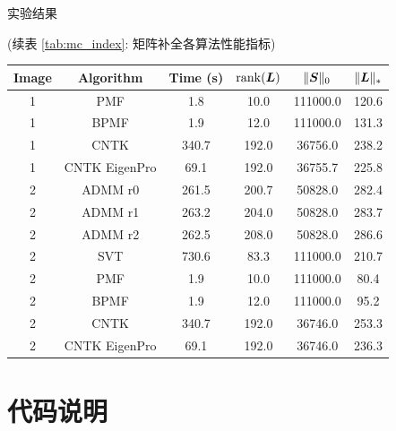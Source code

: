 \documentclass{beamer}
\begin{document}
\begin{frame}{实验结果}
  \centerline{(续表 \ref{tab:mc_index}: 矩阵补全各算法性能指标)}
  \begin{table}[H]
    \centering
    \small
    \begin{tabular}{cccccc}
      \toprule
      Image & Algorithm     & Time (s)  & $\operatorname{rank}(\bm{L})$ & $\|\bm{S}\|_0$  & $\|\bm{L}\|_{*}$ \\
      \midrule
      1     & PMF           & 1.8      & 10.0        & 111000.0    & 120.6         \\
      1     & BPMF          & 1.9      & 12.0        & 111000.0    & 131.3         \\
      1     & CNTK          & 340.7    & 192.0       & 36756.0     & 238.2         \\
      1     & CNTK EigenPro & 69.1     & 192.0       & 36755.7     & 225.8         \\
      2     & ADMM r0       & 261.5    & 200.7       & 50828.0     & 282.4         \\
      2     & ADMM r1       & 263.2    & 204.0       & 50828.0     & 283.7         \\
      2     & ADMM r2       & 262.5    & 208.0       & 50828.0     & 286.6         \\
      2     & SVT           & 730.6    & 83.3        & 111000.0    & 210.7         \\
      2     & PMF           & 1.9      & 10.0        & 111000.0    & 80.4          \\
      2     & BPMF          & 1.9      & 12.0        & 111000.0    & 95.2          \\
      2     & CNTK          & 340.7    & 192.0       & 36746.0     & 253.3         \\
      2     & CNTK EigenPro & 69.1     & 192.0       & 36746.0     & 236.3        \\
      \bottomrule
    \end{tabular}
  \end{table}
\end{frame}

\section[代码]{代码说明}
\end{document}
